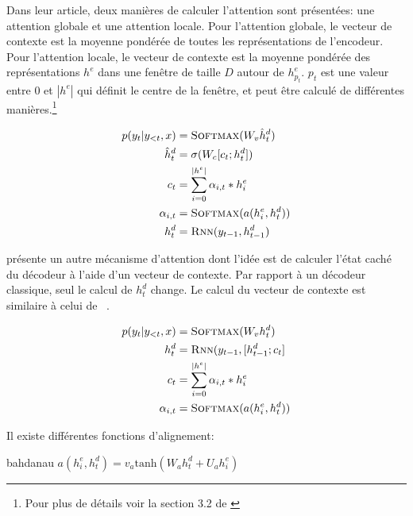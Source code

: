     Dans leur article, deux manières de calculer l'attention sont présentées: une attention globale et une attention locale.
    Pour l'attention globale, le vecteur de contexte est la moyenne pondérée de toutes les représentations de l'encodeur.
    Pour l'attention locale, le vecteur de contexte est la moyenne pondérée des représentations $h^e$ dans une fenêtre de taille $D$ autour de $h^e_{p_t}$.
    $p_t$ est une valeur entre 0 et $|h^e|$ qui définit le centre de la fenêtre, et peut être calculé de différentes manières.\footnote{Pour plus de détails voir la section 3.2 de \cite{luong_effective_2015}}
    
    \begin{align}
        p(y_t | y_{<t}, x) & = \textsc{Softmax}(W_v \hat{h}^d_t) \\
        \hat{h}^d_t & = \sigma(W_c [c_t;h^d_t]) \\
        c_t & = \sum^{|h^e|}_{i=0} \alpha_{i,t} * h^e_i \\
        \alpha_{i,t} & = \textsc{Softmax}(a(h^e_i, h^d_t)) \\
        h^d_t & = \textsc{Rnn}(y_{t-1}, h^d_{t-1})
    \end{align}
    
    \cite{bahdanau_neural_2014} présente un autre mécanisme d'attention dont l'idée est de calculer l'état caché du décodeur à l'aide d'un vecteur de contexte. Par rapport à un décodeur classique, seul le calcul de $h^d_t$ change. Le calcul du vecteur de contexte est similaire à celui de ~\cite{luong_effective_2015}.
    
    \begin{align}
        p(y_t|y_{<t},x) & = \textsc{Softmax}(W_v h^d_t) \\
        h^d_t & = \textsc{Rnn}(y_{t-1}, [h^d_{t-1};c_t]  \\
        c_t & = \sum^{|h^e|}_{i=0} \alpha_{i,t} * h^e_i \\
        \alpha_{i,t} & = \textsc{Softmax}(a(h^e_i, h^d_t))
    \end{align}
    
    Il existe différentes fonctions d'alignement:
    
    bahdanau $a(h^e_i, h^d_t) = v_a \text{tanh}(W_a h^d_t + U_a h^e_i)$
    
